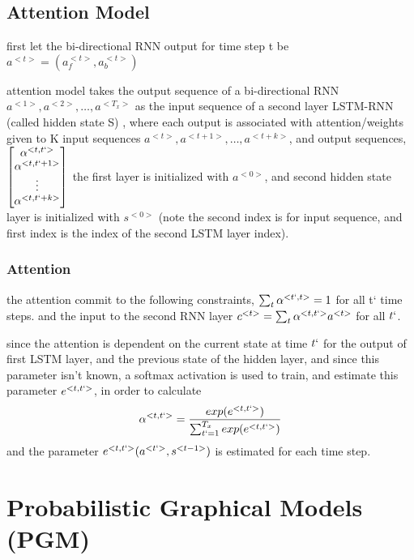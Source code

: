 \documentclass[4apaper,12pt]{book}
\begin{document}
  \section{Attention Model}
  \begin{description}
    \item first let the bi-directional RNN output for time step t be $a^{<t>}=(a_f^{<t>},a_b^{<t>})$
    \item attention model takes the output sequence of a bi-directional RNN $a^{<1>},a^{<2>},\dots,a^{<T_x>}$ as the input sequence of a second layer LSTM-RNN (called hidden state S) , where each output is associated with attention/weights given to K input sequences $a^{<t>},a^{<t+1>},\dots,a^{<t+k>}$, and output sequences, $\begin{bmatrix}\alpha^{<t,t`>} \\ \alpha^{<t,t`+1>}\\ \vdots \\ \alpha^{<t,t`+k>}\end{bmatrix}$ the first layer is initialized with $a^{<0>}$, and second hidden state layer is initialized with $s^{<0>}$ (note the second index is for input sequence, and first index is the index of the second LSTM layer index).
      \subsection{Attention}
      \begin{description}
    \item the attention commit to  the following constraints, $\sum_t\alpha^{<t`,t>}=1$ for all t` time steps. and the input to the second RNN layer $c^{<t>}=\sum_t\alpha^{<t,t`>}a^{<t>}$ for all $t`$.
    \item since the attention is dependent on the current state at time $t`$ for the output of first LSTM layer, and the previous state of the hidden layer, and since this parameter isn't known, a softmax activation is used to train, and estimate this parameter $e^{<t,t`>}$, in order to calculate $$\alpha^{<t,t`>} = \frac{exp(e^{<t,t`>})}{\sum_{t`=1}^{T_x}exp(e^{<t,t`>})} $$ and the parameter $e^{<t,t`>}(a^{<t`>}, s^{<t-1>})$ is estimated for each time step.
      \end{description}


    \end{description}


  \chapter{Probabilistic Graphical Models (PGM)}
\end{document}
